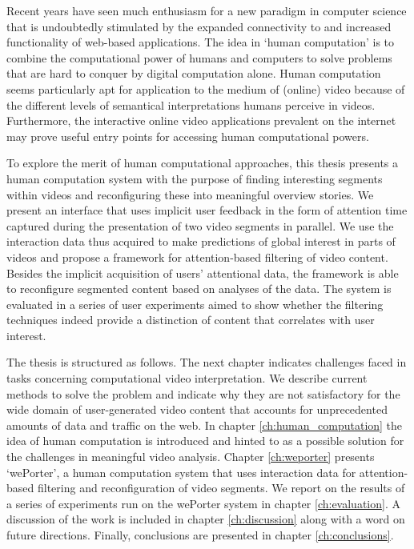 Recent years have seen much enthusiasm for a new paradigm in computer science that is undoubtedly stimulated by the expanded connectivity to and increased functionality of web-based applications. The idea in `human computation' is to combine the computational power of humans and computers to solve problems that are hard to conquer by digital computation alone\cite{vonAhn:2005wi}. Human computation seems particularly apt for application to the medium of (online) video because of the different levels of semantical interpretations humans perceive in videos. Furthermore, the interactive online video applications prevalent on the internet may prove useful entry points for accessing human computational powers.

To explore the merit of human computational approaches, this thesis presents a human computation system with the purpose of finding interesting segments within videos and reconfiguring these into meaningful overview stories. We present an interface that uses implicit user feedback in the form of attention time captured during the presentation of two video segments in parallel. We use the interaction data thus acquired to make predictions of global interest in parts of videos and propose a framework for attention-based filtering of video content. Besides the implicit acquisition of users' attentional data, the framework is able to reconfigure segmented content based on analyses of the data. The system is evaluated in a series of user experiments aimed to show whether the filtering techniques indeed provide a distinction of content that correlates with user interest.

The thesis is structured as follows. The next chapter indicates challenges faced in tasks concerning computational video interpretation. We describe current methods to solve the problem and indicate why they are not satisfactory for the wide domain of user-generated video content that accounts for unprecedented amounts of data and traffic on the web. In chapter \ref{ch:human_computation} the idea of human computation is introduced and hinted to as a possible solution for the challenges in meaningful video analysis. Chapter \ref{ch:weporter} presents `wePorter', a human computation system that uses interaction data for attention-based filtering and reconfiguration of video segments. We report on the results of a series of experiments run on the wePorter system in chapter \ref{ch:evaluation}. A discussion of the work is included in chapter \ref{ch:discussion} along with a word on future directions. Finally, conclusions are presented in chapter \ref{ch:conclusions}.


